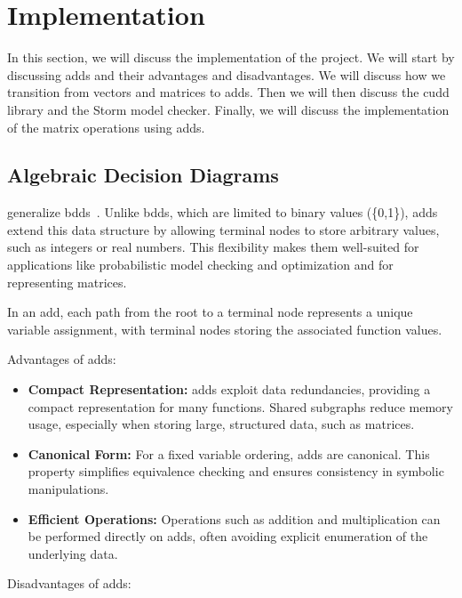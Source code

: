 \section{Implementation}\label{sec:implementation}
In this section, we will discuss the implementation of the project.
We will start by discussing \glspl{add} and their advantages and disadvantages.
We will discuss how we transition from vectors and matrices to \glspl{add}.
Then we will then discuss the \gls{cudd} library and the Storm model checker.
Finally, we will discuss the implementation of the matrix operations using \glspl{add}.

\subsection{Algebraic Decision Diagrams}\label{subsec:algebraic-decision-diagrams}
 generalize \glspl{bdd}~\cite{bahar1997algebric}.
Unlike \glspl{bdd}, which are limited to binary values (\{0,1\}), \glspl{add} extend this data structure by allowing terminal nodes to store arbitrary values, such as integers or real numbers.
This flexibility makes them well-suited for applications like probabilistic model checking and optimization and for representing matrices.

In an \gls{add}, each path from the root to a terminal node represents a unique variable assignment, with terminal nodes storing the associated function values.

Advantages of \glspl{add}:

\begin{itemize}
    \item \textbf{Compact Representation:} \glspl{add} exploit data redundancies, providing a compact representation for many functions.
    Shared subgraphs reduce memory usage, especially when storing large, structured data, such as matrices.
    \item \textbf{Canonical Form:} For a fixed variable ordering, \glspl{add} are canonical.
    This property simplifies equivalence checking and ensures consistency in symbolic manipulations.
    \item \textbf{Efficient Operations:} Operations such as addition and multiplication can be performed directly on \glspl{add}, often avoiding explicit enumeration of the underlying data.
\end{itemize}


Disadvantages of \glspl{add}:

